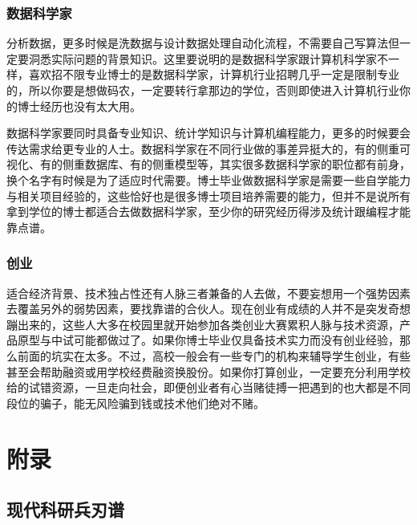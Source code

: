 \documentclass[]{tufte-book}
\begin{document}
\hypertarget{ux6570ux636eux79d1ux5b66ux5bb6}{%
\subsection{数据科学家}\label{ux6570ux636eux79d1ux5b66ux5bb6}}

分析数据，更多时候是洗数据与设计数据处理自动化流程，不需要自己写算法但一定要洞悉实际问题的背景知识。这里要说明的是数据科学家跟计算机科学家不一样，喜欢招不限专业博士的是数据科学家，计算机行业招聘几乎一定是限制专业的，所以你要是想做码农，一定要转行拿那边的学位，否则即使进入计算机行业你的博士经历也没有太大用。

数据科学家要同时具备专业知识、统计学知识与计算机编程能力，更多的时候要会传达需求给更专业的人士。数据科学家在不同行业做的事差异挺大的，有的侧重可视化、有的侧重数据库、有的侧重模型等，其实很多数据科学家的职位都有前身，换个名字有时候是为了适应时代需要。博士毕业做数据科学家是需要一些自学能力与相关项目经验的，这些恰好也是很多博士项目培养需要的能力，但并不是说所有拿到学位的博士都适合去做数据科学家，至少你的研究经历得涉及统计跟编程才能靠点谱。

\hypertarget{ux521bux4e1a}{%
\subsection{创业}\label{ux521bux4e1a}}

适合经济背景、技术独占性还有人脉三者兼备的人去做，不要妄想用一个强势因素去覆盖另外的弱势因素，要找靠谱的合伙人。现在创业有成绩的人并不是突发奇想蹦出来的，这些人大多在校园里就开始参加各类创业大赛累积人脉与技术资源，产品原型与中试可能都做过了。如果你博士毕业仅具备技术实力而没有创业经验，那么前面的坑实在太多。不过，高校一般会有一些专门的机构来辅导学生创业，有些甚至会帮助融资或用学校经费融资换股份。如果你打算创业，一定要充分利用学校给的试错资源，一旦走向社会，即便创业者有心当赌徒搏一把遇到的也大都是不同段位的骗子，能无风险骗到钱或技术他们绝对不赌。

\hypertarget{appendix}{%
\chapter*{附录}\label{appendix}}

\hypertarget{ux73b0ux4ee3ux79d1ux7814ux5175ux5203ux8c31}{%
\section*{现代科研兵刃谱}\label{ux73b0ux4ee3ux79d1ux7814ux5175ux5203ux8c31}}
\end{document}
